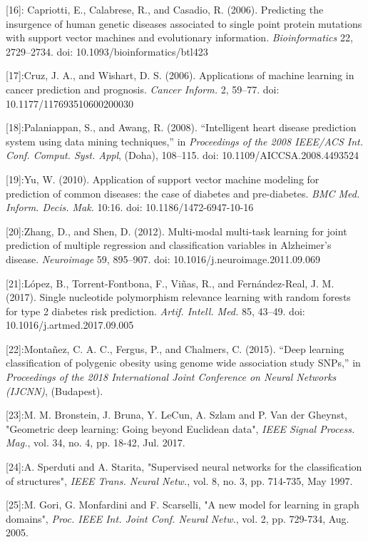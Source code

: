 \documentclass[
]{article}
\begin{document}
{[}16{]}: Capriotti, E., Calabrese, R., and Casadio, R. (2006).
Predicting the insurgence of human genetic diseases associated to single
point protein mutations with support vector machines and evolutionary
information. \emph{Bioinformatics} 22, 2729--2734. doi:
10.1093/bioinformatics/btl423

{[}17{]}:Cruz, J. A., and Wishart, D. S. (2006). Applications of machine
learning in cancer prediction and prognosis. \emph{Cancer Inform.} 2,
59--77. doi: 10.1177/117693510600200030

{[}18{]}:Palaniappan, S., and Awang, R. (2008). ``Intelligent heart
disease prediction system using data mining techniques,'' in
\emph{Proceedings of the 2008 IEEE/ACS Int. Conf. Comput. Syst. Appl},
(Doha), 108--115. doi: 10.1109/AICCSA.2008.4493524

{[}19{]}:Yu, W. (2010). Application of support vector machine modeling
for prediction of common diseases: the case of diabetes and
pre-diabetes. \emph{BMC Med. Inform. Decis. Mak.} 10:16. doi:
10.1186/1472-6947-10-16

{[}20{]}:Zhang, D., and Shen, D. (2012). Multi-modal multi-task learning
for joint prediction of multiple regression and classification variables
in Alzheimer's disease. \emph{Neuroimage} 59, 895--907. doi:
10.1016/j.neuroimage.2011.09.069

{[}21{]}:López, B., Torrent-Fontbona, F., Viñas, R., and Fernández-Real,
J. M. (2017). Single nucleotide polymorphism relevance learning with
random forests for type 2 diabetes risk prediction. \emph{Artif. Intell.
Med.} 85, 43--49. doi: 10.1016/j.artmed.2017.09.005

{[}22{]}:Montañez, C. A. C., Fergus, P., and Chalmers, C. (2015). ``Deep
learning classification of polygenic obesity using genome wide
association study SNPs,'' in \emph{Proceedings of the 2018 International
Joint Conference on Neural Networks (IJCNN)}, (Budapest).

{[}23{]}:M. M. Bronstein, J. Bruna, Y. LeCun, A. Szlam and P. Van der
Gheynst, "Geometric deep learning: Going beyond Euclidean data",
\emph{IEEE Signal Process. Mag.}, vol. 34, no. 4, pp. 18-42, Jul. 2017.

{[}24{]}:A. Sperduti and A. Starita, "Supervised neural networks for the
classification of structures", \emph{IEEE Trans. Neural Netw.}, vol. 8,
no. 3, pp. 714-735, May 1997.

{[}25{]}:M. Gori, G. Monfardini and F. Scarselli, "A new model for
learning in graph domains", \emph{Proc. IEEE Int. Joint Conf. Neural
Netw.}, vol. 2, pp. 729-734, Aug. 2005.
\end{document}
